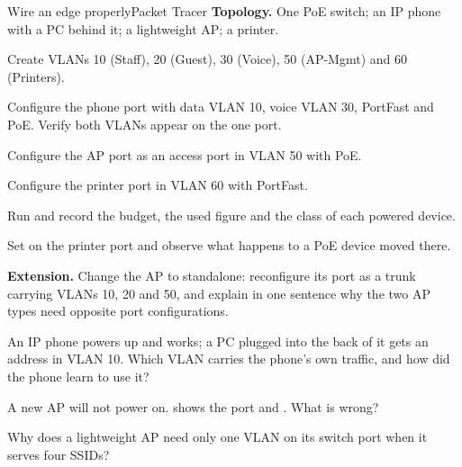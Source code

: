 \begin{lab}{Wire an edge properly}{Packet Tracer}
\textbf{Topology.} One PoE switch; an IP phone with a PC behind it; a lightweight
AP; a printer.

\begin{tasks}
  \item Create VLANs 10 (Staff), 20 (Guest), 30 (Voice), 50 (AP-Mgmt) and 60
        (Printers).
  \item Configure the phone port with data VLAN 10, voice VLAN 30, PortFast and
        PoE. Verify both VLANs appear on the one port.
  \item Configure the AP port as an access port in VLAN 50 with PoE.
  \item Configure the printer port in VLAN 60 with PortFast.
  \item Run  and record the budget, the used figure and
        the class of each powered device.
  \item Set  on the printer port and observe what happens
        to a PoE device moved there.
  \item \textbf{Extension.} Change the AP to standalone: reconfigure its port as
        a trunk carrying VLANs 10, 20 and 50, and explain in one sentence why the
        two AP types need opposite port configurations.
\end{tasks}
\end{lab}

\begin{checkpoint}
\begin{tightnum}
  \item An IP phone powers up and works; a PC plugged into the back of it gets an
        address in VLAN 10. Which VLAN carries the phone's own traffic, and how
        did the phone learn to use it?
  \item A new AP will not power on.  shows the port
         and . What is wrong?
  \item Why does a lightweight AP need only one VLAN on its switch port when it
        serves four SSIDs?
\end{tightnum}
\end{checkpoint}

